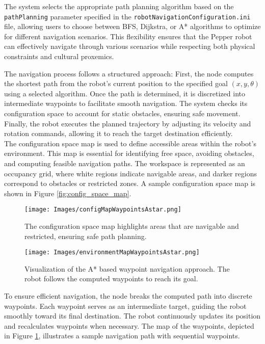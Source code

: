 \documentclass{CSSRforAfrica}
\begin{document}
\noindent The system selects the appropriate path planning algorithm based on the \texttt{pathPlanning} parameter specified in the \texttt{robotNavigationConfiguration.ini} file, allowing users to choose between BFS, Dijkstra, or A* algorithms to optimize for different navigation scenarios. This flexibility ensures that the Pepper robot can effectively navigate through various scenarios while respecting both physical constraints and cultural proxemics.


\noindent The navigation process follows a structured approach: First, the node computes the shortest path from the robot’s current position to the specified goal \( (x, y, \theta) \) using a selected algorithm. Once the path is determined, it is discretized into intermediate waypoints to facilitate smooth navigation. The system checks its configuration space to account for static obstacles, ensuring safe movement. Finally, the robot executes the planned trajectory by adjusting its velocity and rotation commands, allowing it to reach the target destination efficiently.\\


\noindent The configuration space map is used to define accessible areas within the robot’s environment. This map is essential for identifying free space, avoiding obstacles, and computing feasible navigation paths. The workspace is represented as an occupancy grid, where white regions indicate navigable areas, and darker regions correspond to obstacles or restricted zones. A sample configuration space map is shown in Figure \ref{fig:config_space_map}.

\begin{figure}[H]
    \centering
    \begin{minipage}{0.49\textwidth}
        \centering
        \texttt{[image: Images/configMapWaypointsAstar.png]}
        \caption{The configuration space map highlights areas that are navigable and restricted, ensuring safe path planning.}
        \label{fig:config_space_map}
    \end{minipage}
    \hfill
    \begin{minipage}{0.49\textwidth}
        \centering
        \texttt{[image: Images/environmentMapWaypointsAstar.png]}
        \caption{Visualization of the A* based waypoint navigation approach. The robot follows the computed waypoints to reach its goal.}
        \label{fig:waypoint_map}
    \end{minipage}
\end{figure}
\noindent To ensure efficient navigation, the node breaks the computed path into discrete waypoints. Each waypoint serves as an intermediate target, guiding the robot smoothly toward its final destination. The robot continuously updates its position and recalculates waypoints when necessary. The map of the waypoints, depicted in Figure \ref{fig:waypoint_map}, illustrates a sample navigation path with sequential waypoints.\\
\end{document}
